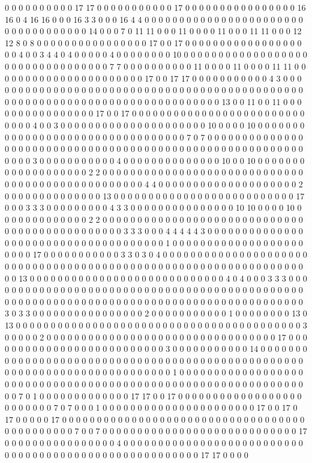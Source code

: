 0 0 0 0 0 0 0 0 0 0 17 17 0 0 0 0 0 0 0 0 0 0 0 17 0 0 0 0 0 0 0 0 0 0 0 0 0 0 0 0 16 16 0 4 16 16 0 0 0 16 3 3 0 0 0 16 4 4 0 0 0 0 0 0 0 0 0 0 0 0 0 0 0 0 0 0 0 0 0 0 0 0 0 0 0 0 0 0 0 0 0 0 0 14 0 0 0 7 0 11 11 0 0 0 11 0 0 0 0 11 0 0 0 11 11 0 0 0 12 12 8 0 8 0 0 0 0 0 0 0 0 0 0 0 0 0 0 0 0 17 0 0 17 0 0 0 0 0 0 0 0 0 0 0 0 0 0 0 0 0 0 0 4 0 0 3 4 4 0 4 0 0 0 0 0 4 0 0 0 0 0 0 0 0 10 0 0 0 0 0 0 0 0 0 0 0 0 0 0 0 0 0 0 0 0 0 0 0 0 0 0 0 0 0 0 0 0 0 7 7 0 0 0 0 0 0 0 0 0 0 11 0 0 0 0 11 0 0 0 0 11 11 0 0 0 0 0 0 0 0 0 0 0 0 0 0 0 0 0 0 0 0 0 0 17 0 0 17 17 0 0 0 0 0 0 0 0 0 0 0 4 3 0 0 0 0 0 0 0 0 0 0 0 0 0 0 0 0 0 0 0 0 0 0 0 0 0 0 0 0 0 0 0 0 0 0 0 0 0 0 0 0 0 0 0 0 0 0 0 0 0 0 0 0 0 0 0 0 0 0 0 0 0 0 0 0 0 0 0 0 0 0 0 0 0 0 0 0 0 13 0 0 11 0 0 11 0 0 0 0 0 0 0 0 0 0 0 0 0 0 0 0 17 0 0 17 0 0 0 0 0 0 0 0 0 0 0 0 0 0 0 0 0 0 0 0 0 0 0 0 0 0 0 0 0 4 0 0 3 0 0 0 0 0 0 0 0 0 0 0 0 0 0 0 0 0 0 0 0 0 10 0 0 0 0 10 0 0 0 0 0 0 0 0 0 0 0 0 0 0 0 0 0 0 0 0 0 0 0 0 0 0 0 0 0 0 0 0 0 7 0 7 0 0 0 0 0 0 0 0 0 0 0 0 0 0 0 0 0 0 0 0 0 0 0 0 0 0 0 0 0 0 0 0 0 0 0 0 0 0 0 0 0 0 0 0 0 0 0 0 0 0 0 0 0 0 0 0 0 0 0 0 0 3 0 0 0 0 0 0 0 0 0 0 0 4 0 0 0 0 0 0 0 0 0 0 0 0 0 0 10 0 0 10 0 0 0 0 0 0 0 0 0 0 0 0 0 0 0 0 0 0 0 2 2 0 0 0 0 0 0 0 0 0 0 0 0 0 0 0 0 0 0 0 0 0 0 0 0 0 0 0 0 0 0 0 0 0 0 0 0 0 0 0 0 0 0 0 0 0 0 0 0 0 4 4 0 0 0 0 0 0 0 0 0 0 0 0 0 0 0 0 0 0 0 0 2 0 0 0 0 0 0 0 0 0 0 0 0 0 0 13 0 0 0 0 0 0 0 0 0 0 0 0 0 0 0 0 0 0 0 0 0 0 0 0 0 0 17 0 0 0 3 3 3 0 0 0 0 0 0 0 0 0 4 3 3 0 0 0 0 0 0 0 0 0 0 0 0 0 0 0 10 10 0 0 0 0 10 0 0 0 0 0 0 0 0 0 0 0 0 0 2 2 0 0 0 0 0 0 0 0 0 0 0 0 0 0 0 0 0 0 0 0 0 0 0 0 0 0 0 0 0 0 0 0 0 0 0 0 0 0 0 0 0 0 0 0 0 0 3 3 3 0 0 0 4 4 4 4 4 3 0 0 0 0 0 0 0 0 0 0 0 0 0 0 0 0 0 0 0 0 0 0 0 0 0 0 0 0 0 0 0 0 0 0 0 0 0 1 0 0 0 0 0 0 0 0 0 0 0 0 0 0 0 0 0 0 0 0 0 0 0 17 0 0 0 0 0 0 0 0 0 0 0 3 3 0 3 0 4 0 0 0 0 0 0 0 0 0 0 0 0 0 0 0 0 0 0 0 0 0 0 0 0 0 0 0 0 0 0 0 0 0 0 0 0 0 0 0 0 0 0 0 0 0 0 0 0 0 0 0 0 0 0 0 0 0 0 0 0 0 0 0 0 0 0 13 0 0 0 0 0 0 0 0 0 0 0 0 0 0 0 0 0 0 0 0 0 0 0 0 0 0 0 0 4 0 4 0 0 0 3 3 3 0 0 0 0 0 0 0 0 0 0 0 0 0 0 0 0 0 0 0 0 0 0 0 0 0 0 0 0 0 0 0 0 0 0 0 0 0 0 0 0 0 0 0 0 0 0 0 0 0 0 0 0 0 0 0 0 0 0 0 0 0 0 0 0 0 0 0 0 0 0 0 0 0 0 0 0 0 0 0 0 0 0 0 0 0 0 0 0 0 3 0 3 3 0 0 0 0 0 0 0 0 0 0 0 0 0 0 0 0 2 0 0 0 0 0 0 0 0 0 0 0 1 0 0 0 0 0 0 0 0 13 0 13 0 0 0 0 0 0 0 0 0 0 0 0 0 0 0 0 0 0 0 0 0 0 0 0 0 0 0 0 0 0 0 0 0 0 0 0 0 0 0 0 0 3 0 0 0 0 0 2 0 0 0 0 0 0 0 0 0 0 0 0 0 0 0 0 0 0 0 0 0 0 0 0 0 0 0 0 0 0 0 0 0 17 0 0 0 0 0 0 0 0 0 0 0 0 0 0 0 0 0 0 0 0 0 0 0 0 0 0 3 0 0 0 0 0 0 0 0 0 0 0 14 0 0 0 0 0 0 0 0 0 0 0 0 0 0 0 0 0 0 0 0 0 0 0 0 0 0 0 0 0 0 0 0 0 0 0 0 0 0 0 0 0 0 0 0 0 0 0 0 0 0 0 0 0 0 0 0 0 0 0 0 0 0 0 0 0 0 0 0 0 0 0 0 0 0 1 0 0 0 0 0 0 0 0 0 0 0 0 0 0 0 0 0 0 0 0 0 0 0 0 0 0 0 0 0 0 0 0 0 0 0 0 0 0 0 0 0 0 0 0 0 0 0 0 0 0 0 0 0 0 0 0 0 0 0 0 0 0 0 7 0 1 0 0 0 0 0 0 0 0 0 0 0 0 0 17 17 0 0 17 0 0 0 0 0 0 0 0 0 0 0 0 0 0 0 0 0 0 0 0 0 0 0 0 0 7 0 7 0 0 0 1 0 0 0 0 0 0 0 0 0 0 0 0 0 0 0 0 0 0 0 0 0 0 17 0 0 17 0 17 0 0 0 0 0 17 0 0 0 0 0 0 0 0 0 0 0 0 0 0 0 0 0 0 0 0 0 0 0 0 0 0 0 0 0 0 0 0 0 0 0 0 0 0 0 0 0 0 0 0 0 7 0 0 7 0 0 0 0 0 0 0 0 0 0 0 0 0 0 0 0 0 0 0 0 0 0 0 0 0 0 0 0 17 0 0 0 0 0 0 0 0 0 0 0 0 0 0 0 0 4 0 0 0 0 0 0 0 0 0 0 0 0 0 0 0 0 0 0 0 0 0 0 0 0 0 0 0 0 0 0 0 0 0 0 0 0 0 0 0 0 0 0 0 0 0 0 0 0 0 0 0 0 0 0 17 17 0 0 0 0 